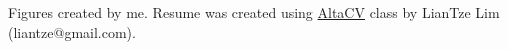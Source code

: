 \documentclass[10pt,a4paper]{altacv}
\begin{document}

Figures created by me. Resume was created using \href{https://github.com/liantze/AltaCV}{AltaCV} class by LianTze Lim (liantze@gmail.com).



\clearpage
\end{document}
